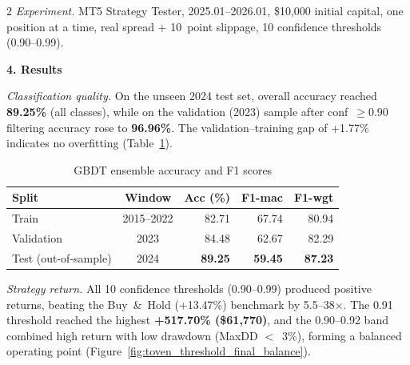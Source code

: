 \begin{multicols*}{2}
\emph{Experiment.} MT5 Strategy Tester, 2025.01--2026.01, \$10{,}000 initial capital, one position at a time, real spread + 10~point slippage, 10 confidence thresholds (0.90--0.99).

\noindent\textbf{4. Results}

\emph{Classification quality.} On the unseen 2024 test set, overall accuracy reached \textbf{89.25\%} (all classes), while on the validation (2023) sample after conf~$\geq 0.90$ filtering accuracy rose to \textbf{96.96\%}. The validation--training gap of +1.77\% indicates no overfitting (Table~\ref{tab:toven_model_accuracy}).

\begin{table}[H]
\centering
\caption{GBDT ensemble accuracy and F1 scores}
\label{tab:toven_model_accuracy}
\scriptsize
\renewcommand{\arraystretch}{1.15}
\setlength{\tabcolsep}{3pt}
\begin{tabular}{|l|c|r|r|r|}
\hline
Split & Window & Acc (\%) & F1-mac & F1-wgt \\ \hline
Train               & 2015--2022 & 82.71 & 67.74 & 80.94 \\ \hline
Validation          & 2023       & 84.48 & 62.67 & 82.29 \\ \hline
Test (out-of-sample) & 2024      & \textbf{89.25} & \textbf{59.45} & \textbf{87.23} \\ \hline
\end{tabular}
\end{table}

\emph{Strategy return.} All 10 confidence thresholds (0.90--0.99) produced positive returns, beating the Buy~\&~Hold (+13.47\%) benchmark by 5.5--38$\times$. The 0.91 threshold reached the highest \textbf{+517.70\% (\$61{,}770)}, and the 0.90--0.92 band combined high return with low drawdown (MaxDD $<$~3\%), forming a balanced operating point (Figure~\ref{fig:toven_threshold_final_balance}).


\end{multicols*}
